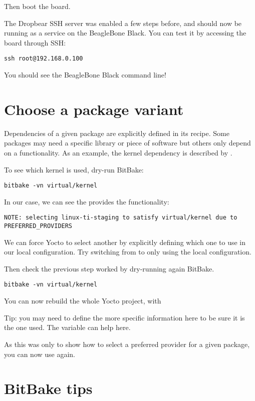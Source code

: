 Then boot the board.

The Dropbear SSH server was enabled a few steps before, and should now be
running as a service on the BeagleBone Black. You can test it by accessing the
board through SSH:
\begin{verbatim}
ssh root@192.168.0.100
\end{verbatim}

You should see the BeagleBone Black command line!

\section{Choose a package variant}

Dependencies of a given package are explicitly defined in its recipe.
Some packages may need a specific library or piece of software but
others only depend on a functionality. As an example, the kernel
dependency is described by .

To see which kernel is used, dry-run BitBake:
\begin{verbatim}
bitbake -vn virtual/kernel
\end{verbatim}

In our case, we can see the  provides the
 functionality:
\small
\begin{verbatim}
NOTE: selecting linux-ti-staging to satisfy virtual/kernel due to PREFERRED_PROVIDERS
\end{verbatim}
\normalsize

We can force Yocto to select another  by explicitly
defining which one to use in our local configuration. Try switching
from  to  only using the
local configuration.

Then check the previous step worked by dry-running again BitBake.
\begin{verbatim}
bitbake -vn virtual/kernel
\end{verbatim}

You can now rebuild the whole Yocto project, with 

Tip: you may need to define the more specific information here to be sure
it is the one used. The  variable can help here.

As this was only to show how to select a preferred provider for a
given package, you can now use  again.

\section{BitBake tips}

